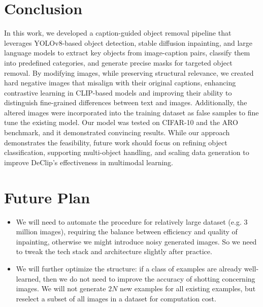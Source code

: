 \documentclass[11pt,letterpaper]{article}
\begin{document}
\section{Conclusion}
In this work, we developed a caption-guided object removal pipeline that leverages YOLOv8-based object detection, stable diffusion inpainting, and large language models to extract key objects from image-caption pairs, classify them into predefined categories, and generate precise masks for targeted object removal. By modifying images, while preserving structural relevance, we created hard negative images that misalign with their original captions, enhancing contrastive learning in CLIP-based models and improving their ability to distinguish fine-grained differences between text and images. Additionally, the altered images were incorporated into the training dataset as false samples to fine tune the existing model. Our model was tested on CIFAR-10 and the ARO benchmark, and it demonstrated convincing results. While our approach demonstrates the feasibility, future work should focus on refining object classification, supporting multi-object handling, and scaling data generation to improve DeClip’s effectiveness in multimodal learning.

\section{Future Plan}
\begin{itemize}
    \item We will need to automate the procedure for relatively large dataset (e.g. 3 million images), requiring the balance between efficiency and quality of inpainting, otherwise we might introduce noisy generated images. So we need to tweak the tech stack and architecture slightly after practice.
    \item We will further optimize the structure: if a class of examples are already well-learned, then we do not need to improve the accuracy of shotting concerning images. We will not generate $2N$ new examples for all existing examples, but reselect a subset of all images in a dataset for computation cost.
\end{itemize}
\end{document}
